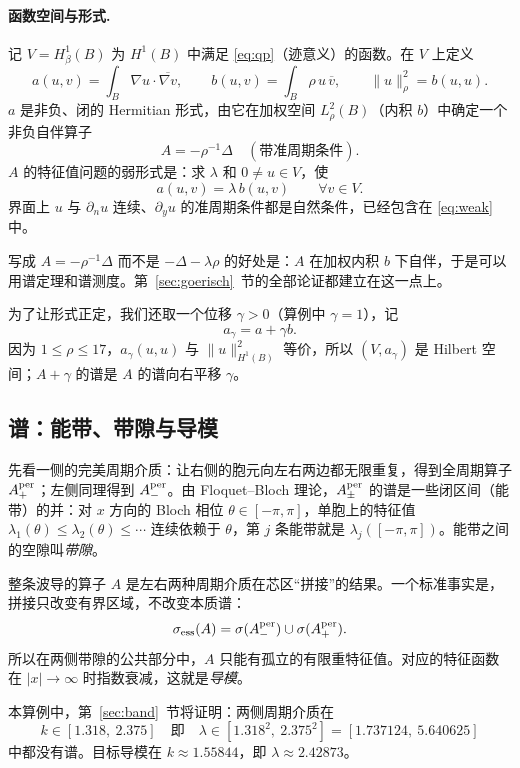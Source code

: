 \documentclass[11pt,a4paper,fontset=fandol]{ctexart}
\begin{document}
\paragraph{函数空间与形式.} 记 $V=H^1_\beta(B)$ 为 $H^1(B)$ 中满足 \eqref{eq:qp}（迹意义）的函数。在 $V$ 上定义
\[
a(u,v)=\int_B\nabla u\cdot\overline{\nabla v},\qquad
b(u,v)=\int_B\rho\,u\,\overline v,\qquad \|u\|_\rho^2=b(u,u).
\]
$a$ 是非负、闭的 Hermitian 形式，由它在加权空间 $L^2_\rho(B)$（内积 $b$）中确定一个非负自伴算子
\[
A=-\rho^{-1}\Delta\quad(\text{带准周期条件}) .
\]
$A$ 的特征值问题的弱形式是：求 $\lambda$ 和 $0\ne u\in V$，使
\begin{equation}
\label{eq:weak}
a(u,v)=\lambda\,b(u,v)\qquad\forall v\in V .
\end{equation}
界面上 $u$ 与 $\partial_nu$ 连续、$\partial_yu$ 的准周期条件都是自然条件，已经包含在 \eqref{eq:weak} 中。

\begin{remark}
写成 $A=-\rho^{-1}\Delta$ 而不是 $-\Delta-\lambda\rho$ 的好处是：$A$ 在加权内积 $b$ 下自伴，于是可以用谱定理和谱测度。第~\ref{sec:goerisch}~节的全部论证都建立在这一点上。
\end{remark}

为了让形式正定，我们还取一个位移 $\gamma>0$（算例中 $\gamma=1$），记
\[
a_\gamma=a+\gamma b .
\]
因为 $1\le\rho\le17$，$a_\gamma(u,u)$ 与 $\|u\|_{H^1(B)}^2$ 等价，所以 $(V,a_\gamma)$ 是 Hilbert 空间；$A+\gamma$ 的谱是 $A$ 的谱向右平移 $\gamma$。

\subsection{谱：能带、带隙与导模}

先看一侧的完美周期介质：让右侧的胞元向左右两边都无限重复，得到全周期算子 $A^{\rm per}_+$；左侧同理得到 $A^{\rm per}_-$。由 Floquet--Bloch 理论，$A^{\rm per}_\pm$ 的谱是一些闭区间（能带）的并：对 $x$ 方向的 Bloch 相位 $\theta\in[-\pi,\pi]$，单胞上的特征值 $\lambda_1(\theta)\le\lambda_2(\theta)\le\cdots$ 连续依赖于 $\theta$，第 $j$ 条能带就是 $\lambda_j([-\pi,\pi])$。能带之间的空隙叫\emph{带隙}。

整条波导的算子 $A$ 是左右两种周期介质在芯区“拼接”的结果。一个标准事实是，拼接只改变有界区域，不改变本质谱：
\[
\sigma_{\rm ess}(A)=\sigma(A^{\rm per}_-)\cup\sigma(A^{\rm per}_+).
\]
所以在两侧带隙的公共部分中，$A$ 只能有孤立的有限重特征值。对应的特征函数在 $|x|\to\infty$ 时指数衰减，这就是\emph{导模}。

本算例中，第~\ref{sec:band}~节将证明：两侧周期介质在
\[
k\in[1.318,\ 2.375]\quad\text{即}\quad\lambda\in[1.318^2,\ 2.375^2]=[1.737124,\ 5.640625]
\]
中都没有谱。目标导模在 $k\approx1.55844$，即 $\lambda\approx2.42873$。
\end{document}
